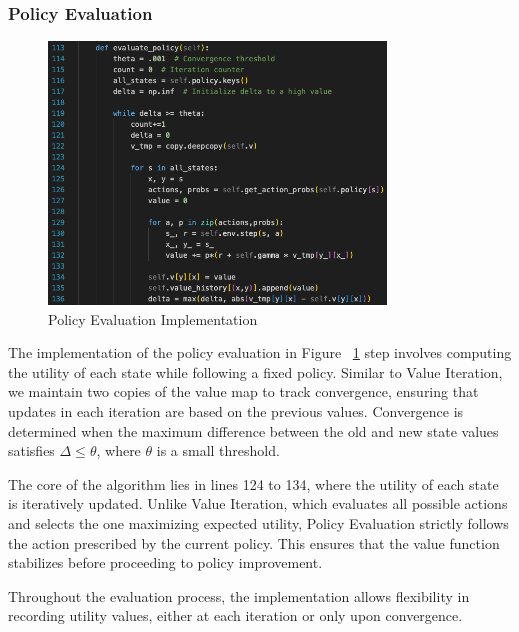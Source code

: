 \subsubsection{Policy Evaluation}

\begin{figure}[H]
    \centering
    \includegraphics[width=0.8\textwidth]{images/policy_eval_impl.png}
    \caption{Policy Evaluation Implementation}
    \label{pe_impl}
\end{figure}

\noindent The implementation of the policy evaluation in Figure ~\ref{pe_impl} step involves computing the utility of each state while following a fixed policy. Similar to Value Iteration, we maintain two copies of the value map to track convergence, ensuring that updates in each iteration are based on the previous values. Convergence is determined when the maximum difference between the old and new state values satisfies $\Delta \leq \theta$, where $\theta$ is a small threshold.\vspace{10pt}

\noindent The core of the algorithm lies in lines 124 to 134, where the utility of each state is iteratively updated. Unlike Value Iteration, which evaluates all possible actions and selects the one maximizing expected utility, Policy Evaluation strictly follows the action prescribed by the current policy. This ensures that the value function stabilizes before proceeding to policy improvement.\vspace{10pt}

\noindent Throughout the evaluation process, the implementation allows flexibility in recording utility values, either at each iteration or only upon convergence.

